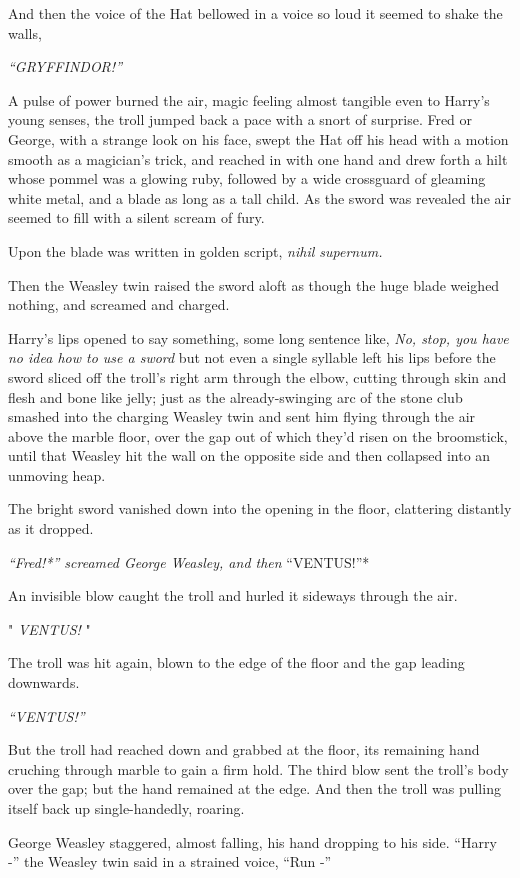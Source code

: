 And then the voice of the Hat bellowed in a voice so loud it seemed to
shake the walls,

\emph{``GRYFFINDOR!''}

A pulse of power burned the air, magic feeling almost tangible even to
Harry's young senses, the troll jumped back a pace with a snort of
surprise. Fred or George, with a strange look on his face, swept the Hat
off his head with a motion smooth as a magician's trick, and reached in
with one hand and drew forth a hilt whose pommel was a glowing ruby,
followed by a wide crossguard of gleaming white metal, and a blade as
long as a tall child. As the sword was revealed the air seemed to fill
with a silent scream of fury.

Upon the blade was written in golden script, \emph{nihil supernum.}

Then the Weasley twin raised the sword aloft as though the huge blade
weighed nothing, and screamed and charged.

Harry's lips opened to say something, some long sentence like, \emph{No,
stop, you have no idea how to use a sword} but not even a single
syllable left his lips before the sword sliced off the troll's right arm
through the elbow, cutting through skin and flesh and bone like jelly;
just as the already-swinging arc of the stone club smashed into the
charging Weasley twin and sent him flying through the air above the
marble floor, over the gap out of which they'd risen on the broomstick,
until that Weasley hit the wall on the opposite side and then collapsed
into an unmoving heap.

The bright sword vanished down into the opening in the floor, clattering
distantly as it dropped.

\emph{``Fred!*'' screamed George Weasley, and then }``VENTUS!''*

An invisible blow caught the troll and hurled it sideways through the
air.

" \emph{VENTUS!} "

The troll was hit again, blown to the edge of the floor and the gap
leading downwards.

\emph{``VENTUS!''}

But the troll had reached down and grabbed at the floor, its remaining
hand cruching through marble to gain a firm hold. The third blow sent
the troll's body over the gap; but the hand remained at the edge. And
then the troll was pulling itself back up single-handedly, roaring.

George Weasley staggered, almost falling, his hand dropping to his side.
``Harry -'' the Weasley twin said in a strained voice, ``Run -''

